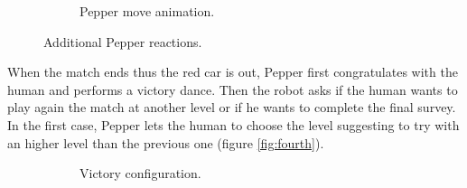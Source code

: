 \documentclass{article}
\begin{document}
\begin{figure}[H]
\begin{subfigure}{.33\textwidth}
      \caption{Pepper move animation.}
    \end{subfigure}
    \caption{Additional Pepper reactions.}
    \label{fig:third}
\end{figure}

When the match ends thus the red car is out, Pepper first congratulates with the human and performs a victory dance. Then the robot asks if the human wants to play again the match at another level or if he wants to complete the final survey. In the first case, Pepper lets the human to choose the level suggesting to try with an higher level than the previous one (figure \ref{fig:fourth}).

\begin{figure}[H]
    \centering
    \begin{subfigure}{.33\textwidth}
      \centering
      \caption{Victory configuration.}
    \end{subfigure}%
    \begin{subfigure}{.33\textwidth}
      \centering

\end{subfigure}
\end{figure}
\end{document}
